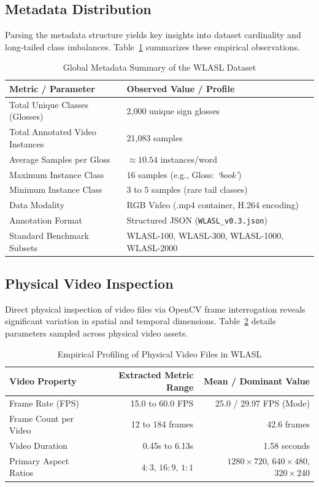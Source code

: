 \documentclass[12pt,a4paper]{article}
\begin{document}
\subsection{Metadata Distribution}
Parsing the metadata structure yields key insights into dataset cardinality and long-tailed class imbalances. Table~\ref{tab:wlasl_metadata} summarizes these empirical observations.

\begin{table}[htbp]
\centering
\caption{Global Metadata Summary of the WLASL Dataset}
\label{tab:wlasl_metadata}
\begin{tabular}{ll}
\toprule
\textbf{Metric / Parameter} & \textbf{Observed Value / Profile} \\
\midrule
Total Unique Classes (Glosses) & 2,000 unique sign glosses \\
Total Annotated Video Instances & 21,083 samples \\
Average Samples per Gloss & $\approx 10.54$ instances/word \\
Maximum Instance Class & 16 samples (e.g., Gloss: \textit{`book'}) \\
Minimum Instance Class & 3 to 5 samples (rare tail classes) \\
Data Modality & RGB Video (.mp4 container, H.264 encoding) \\
Annotation Format & Structured JSON (\texttt{WLASL\_v0.3.json}) \\
Standard Benchmark Subsets & WLASL-100, WLASL-300, WLASL-1000, WLASL-2000 \\
\bottomrule
\end{tabular}
\end{table}

\subsection{Physical Video Inspection}
Direct physical inspection of video files via OpenCV frame interrogation reveals significant variation in spatial and temporal dimensions. Table~\ref{tab:video_metrics} details parameters sampled across physical video assets.

\begin{table}[htbp]
\centering
\caption{Empirical Profiling of Physical Video Files in WLASL}
\label{tab:video_metrics}
\begin{tabular}{lrr}
\toprule
\textbf{Video Property} & \textbf{Extracted Metric Range} & \textbf{Mean / Dominant Value} \\
\midrule
Frame Rate (FPS) & 15.0 to 60.0 FPS & 25.0 / 29.97 FPS (Mode) \\
Frame Count per Video & 12 to 184 frames & 42.6 frames \\
Video Duration & 0.45s to 6.13s & 1.58 seconds \\
Primary Aspect Ratios & $4:3$, $16:9$, $1:1$ & $1280\times720$, $640\times480$, $320\times240$ \\
\bottomrule
\end{tabular}
\end{table}
\end{document}
